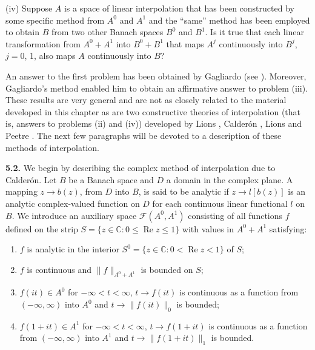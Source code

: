 \textup{(iv)} Suppose $A$ is a space of linear interpolation that has been
constructed by some specific method from $A^{0}$ and $A^{1}$ and the ``same''
method has been employed to obtain $B$ from two other Banach spaces $B^{0}$ and
$B^{1}$. Is it true that each linear transformation from $A^{0} + A^{1}$ into
$B^{0} + B^{1}$ that maps $A^{j}$ continuously into $B^{j}$, $j = 0$, 1, also
maps $A$ continuously into $B$?

An answer to the first problem has been obtained by Gagliardo (see
\cite{Gagliardo1}). Moreover, Gagliardo's method enabled him to obtain an
affirmative answer to problem (iii). These results are very general and are not
as closely related to the material developed in this chapter as are two
constructive theories of interpolation (that is, answers to problems (ii) and
(iv)) developed by Lions \cite{Lions1}, Calder\'on \cite{Calderon2}, Lions and
Peetre \cite{LionsPeetre1}. The next few paragraphs will be devoted to a
description of these methods of interpolation.

\textbf{5.2.} We begin by describing the complex method of interpolation due
to Calder\'on. Let $B$ be a Banach space and $D$ a domain in the complex
plane. A mapping $z \to b(z)$, from $D$ into $B$, is said to be analytic if
$z \to l[b(z)]$ is an analytic complex-valued function on $D$ for each
continuous linear functional $l$ on $B$. We introduce an auxiliary space
$\mathcal{F}(A^{0}, A^{1})$ consisting of all functions $f$ defined on the
strip $S = \{z \in \mathbb{C} : 0 \leq \operatorname{Re} z \leq 1\}$ with
values in $A^{0} + A^{1}$ satisfying:

\begin{enumerate}[label=(\arabic*),leftmargin=*,itemsep=0pt]
\item $f$ is analytic in the interior
$S^{0} = \{z \in \mathbb{C} : 0 < \operatorname{Re} z < 1\}$ of $S$;
\item $f$ is continuous and $\|f\|_{A^{0}+A^{1}}$ is bounded on $S$;
\item $f(it) \in A^{0}$ for $-\infty < t < \infty$,
$t \to f(it)$ is continuous as a function from $(-\infty, \infty)$ into $A^{0}$
and $t \to \|f(it)\|_{0}$ is bounded;
\item $f(1 + it) \in A^{1}$ for $-\infty < t < \infty$,
$t \to f(1 + it)$ is continuous as a function from $(-\infty, \infty)$ into
$A^{1}$ and $t \to \|f(1 + it)\|_{1}$ is bounded.
\end{enumerate}

